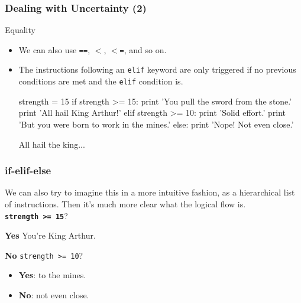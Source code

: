 \documentclass[10pt]{beamer}
\begin{document}
\begin{frame}[fragile]
  \frametitle{Dealing with Uncertainty (2)}
  \begin{block}{Equality}
    \begin{itemize}
      \item We can also use \texttt{==}, \texttt{$<$}, \texttt{$<$=}, and so on.
      \item The instructions following an \texttt{elif} keyword are only triggered if no previous conditions are met and the \texttt{elif} condition is.
      \begin{pythoncode}
  strength = 15
  if strength >= 15:
    print 'You pull the sword from the stone.'
    print 'All hail King Arthur!'
  elif strength >= 10:
    print 'Solid effort.'
    print 'But you were born to work in the mines.'
  else:
    print 'Nope! Not even close.'
      \end{pythoncode}
      All hail the king...
    \end{itemize}
  \end{block}
\end{frame}

\begin{frame}[fragile]
  \frametitle{if-elif-else}
  We can also try to imagine this in a more intuitive fashion, as a hierarchical list of instructions.
  Then it's much more clear what the logical flow is. \\
  \vspace{10px}
  \large
  \textbf{\texttt{strength >= 15}}?
  \normalsize
  \begin{block}{\textbf{Yes}}
    You're King Arthur.
  \end{block}
  \vspace{10px}
  \begin{block}{\textbf{No}}
    \indent \texttt{strength >= 10}?
    \begin{itemize}
      \item \textbf{Yes}: to the mines.
      \item \textbf{No}: not even close.
    \end{itemize}
  \end{block}
\end{frame}
\end{document}
